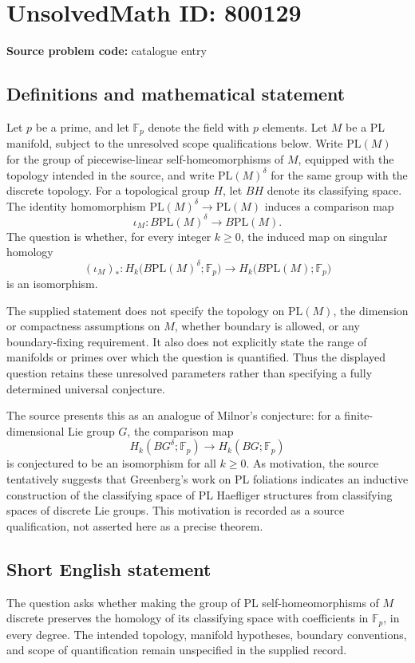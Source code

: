 \documentclass[11pt]{article}
\begin{document}
\section*{UnsolvedMath ID: 800129}
\textbf{Source problem code:} catalogue entry
\subsection{Definitions and mathematical statement}
Let \(p\) be a prime, and let \(\mathbb F_p\) denote the field with \(p\) elements. Let \(M\) be a PL manifold, subject to the unresolved scope qualifications below. Write \(\mathrm{PL}(M)\) for the group of piecewise-linear self-homeomorphisms of \(M\), equipped with the topology intended in the source, and write \(\mathrm{PL}(M)^\delta\) for the same group with the discrete topology. For a topological group \(H\), let \(BH\) denote its classifying space. The identity homomorphism \(\mathrm{PL}(M)^\delta\to\mathrm{PL}(M)\) induces a comparison map
\[
\iota_M\colon B\mathrm{PL}(M)^\delta\longrightarrow B\mathrm{PL}(M).
\]
The question is whether, for every integer \(k\geq 0\), the induced map on singular homology
\[
(\iota_M)_*\colon H_k\bigl(B\mathrm{PL}(M)^\delta;\mathbb F_p\bigr)\longrightarrow H_k\bigl(B\mathrm{PL}(M);\mathbb F_p\bigr)
\]
is an isomorphism.

The supplied statement does not specify the topology on \(\mathrm{PL}(M)\), the dimension or compactness assumptions on \(M\), whether boundary is allowed, or any boundary-fixing requirement. It also does not explicitly state the range of manifolds or primes over which the question is quantified. Thus the displayed question retains these unresolved parameters rather than specifying a fully determined universal conjecture.

The source presents this as an analogue of Milnor's conjecture: for a finite-dimensional Lie group \(G\), the comparison map
\[
H_k(BG^\delta;\mathbb F_p)\longrightarrow H_k(BG;\mathbb F_p)
\]
is conjectured to be an isomorphism for all \(k\geq 0\). As motivation, the source tentatively suggests that Greenberg's work on PL foliations indicates an inductive construction of the classifying space of PL Haefliger structures from classifying spaces of discrete Lie groups. This motivation is recorded as a source qualification, not asserted here as a precise theorem.
\subsection{Short English statement}
The question asks whether making the group of PL self-homeomorphisms of \(M\) discrete preserves the homology of its classifying space with coefficients in \(\mathbb F_p\), in every degree. The intended topology, manifold hypotheses, boundary conventions, and scope of quantification remain unspecified in the supplied record.
\end{document}

